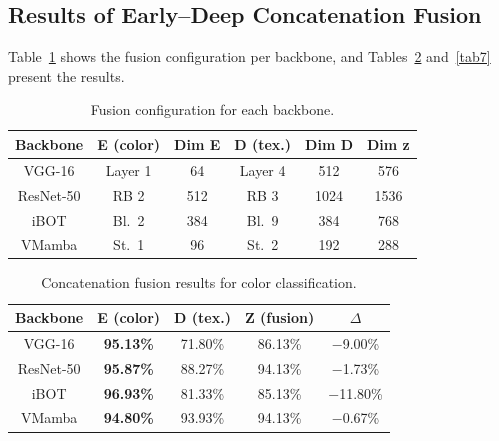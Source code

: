 \documentclass[conference]{IEEEtran}
\begin{document}
\subsection{Results of Early--Deep Concatenation Fusion}

Table~\ref{tab5} shows the fusion configuration per backbone, and
Tables~\ref{tab6} and~\ref{tab7} present the results.

\begin{table}[htbp]
\caption{Fusion configuration for each backbone.}
\begin{center}
\begin{tabular}{c|c|c|c|c|c}
\hline
\textbf{Backbone} & \textbf{E (color)} & \textbf{Dim E}
                  & \textbf{D (tex.)} & \textbf{Dim D} & \textbf{Dim z} \\
\hline
VGG-16    & Layer 1 & 64  & Layer 4 & 512  & 576  \\
ResNet-50 & RB 2    & 512 & RB 3    & 1024 & 1536 \\
iBOT      & Bl.\ 2  & 384 & Bl.\ 9  & 384  & 768  \\
VMamba    & St.\ 1  & 96  & St.\ 2  & 192  & 288  \\
\hline
\end{tabular}
\label{tab5}
\end{center}
\end{table}

\begin{table}[htbp]
\caption{Concatenation fusion results for color classification.}
\begin{center}
\begin{tabular}{c|c|c|c|c}
\hline
\textbf{Backbone} & \textbf{E (color)} & \textbf{D (tex.)}
                  & \textbf{Z (fusion)} & \textbf{$\Delta$} \\
\hline
VGG-16    & \textbf{95.13\%} & 71.80\% & 86.13\% & $-$9.00\%  \\
ResNet-50 & \textbf{95.87\%} & 88.27\% & 94.13\% & $-$1.73\%  \\
iBOT      & \textbf{96.93\%} & 81.33\% & 85.13\% & $-$11.80\% \\
VMamba    & \textbf{94.80\%} & 93.93\% & 94.13\% & $-$0.67\%  \\
\hline
\end{tabular}
\label{tab6}
\end{center}
\end{table}
\end{document}
